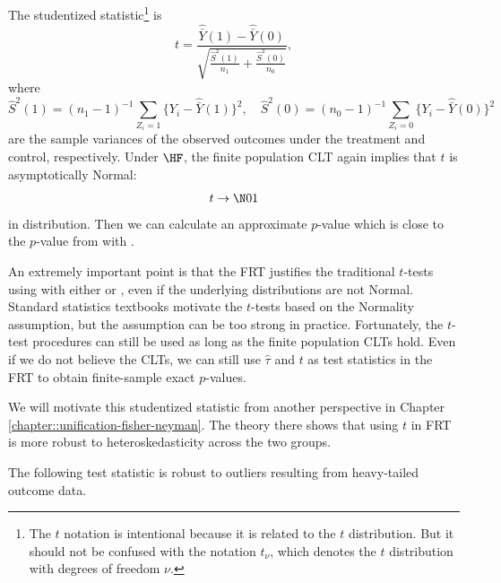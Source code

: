 \begin{example}
\label{eg::studentized-statistic}
The studentized statistic\footnote{The $t$ notation is intentional because it is related to the $t$ distribution. But it should not be confused with the notation $t_\nu$, which denotes the $t$ distribution with degrees of freedom $\nu$.} is 
$$
t = \frac{    \hat{\bar{Y}}(1)  -   \hat{\bar{Y}}(0)    }{  \sqrt{  \frac{  \hat{S}^2(1)  }{n_1}  + \frac{\hat{S}^2(0)}{n_0}  }   },
$$
where 
$$
\hat{S}^2(1) = (n_1 - 1)^{-1} \sum_{Z_i =1} \{ Y_i  -\hat{\bar{Y}}(1)   \}^2,\quad
\hat{S}^2(0) = (n_0 - 1)^{-1} \sum_{Z_i =0} \{ Y_i  -\hat{\bar{Y}}(0)   \}^2 
$$
are the sample variances of the observed outcomes under the treatment and control, respectively. Under $\HF$, the finite population CLT again implies that $t$ is asymptotically Normal: 
$$
t \rightarrow \N01 
$$
in distribution. 
Then we can calculate an approximate $p$-value which is close to the $p$-value from  with .
\end{example}



An extremely important point is that the FRT justifies the traditional $t$-tests using  with either  or , even if the underlying distributions are not Normal. Standard statistics textbooks motivate the $t$-tests based on the Normality assumption, but the assumption can be too strong in practice. Fortunately, the $t$-test procedures can still be used as long as the finite population CLTs hold. Even if we do not believe the CLTs, we can still use $\hat{\tau}$ and $t$ as test statistics in the FRT to obtain finite-sample exact $p$-values. 


We will motivate this studentized statistic from another perspective in Chapter \ref{chapter::unification-fisher-neyman}. The theory there shows that using $t$ in FRT is more robust to heteroskedasticity across the two groups. 


The following test statistic is robust to outliers resulting from heavy-tailed outcome data. 




